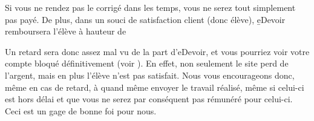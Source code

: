 ﻿Si vous ne rendez pas le corrigé dans les temps, vous ne serez tout simplement pas payé. De plus, dans un souci de satisfaction client (donc élève), \b{eDevoir} remboursera l’élève à hauteur de %

Un retard sera donc assez mal vu de la part d’eDevoir, et vous pourriez voir votre compte bloqué définitivement (voir ). En effet, non seulement le site perd de l’argent, mais en plus l’élève n’est pas satisfait. Nous vous encourageons donc, même en cas de retard, à quand même envoyer le travail réalisé, même si celui-ci est hors délai et que vous ne serez par conséquent pas rémunéré pour celui-ci. Ceci est un gage de bonne foi pour nous.